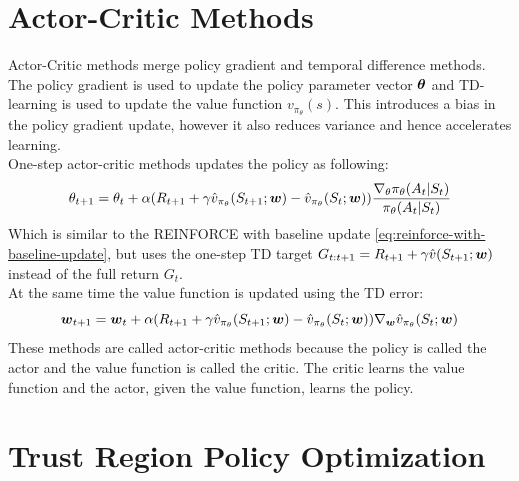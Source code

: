 \section{Actor-Critic Methods}
Actor-Critic methods merge policy gradient and temporal difference methods. The policy gradient is used to update the policy parameter vector $\boldsymbol{\theta}$ and TD-learning is used to update the value function $v_{\pi_{\theta}}(s)$. This introduces a bias in the policy gradient update, however it also reduces variance and hence accelerates learning.\\
One-step actor-critic methods updates the policy as following:
\begin{equation}
    \theta_{t+1} = \theta_t + \alpha (R_{t+1} + \gamma \hat{v}_{\pi_{\theta}}(S_{t+1}; \boldsymbol{w}) - \hat{v}_{\pi_{\theta}}(S_t; \boldsymbol{w})) \frac{\nabla_{\theta} \pi_{\theta}(A_t|S_t)}{\pi_{\theta}(A_t|S_t)}
    \label{eq:one-step-actor-critic-update}
\end{equation}
Which is similar to the REINFORCE with baseline update \eqref{eq:reinforce-with-baseline-update}, but uses the one-step TD target $G_{t:t+1} = R_{t+1} + \gamma \hat{v}(S_{t+1}; \boldsymbol{w})$ instead of the full return $G_t$.\\
At the same time the value function is updated using the TD error:
\begin{equation}
    \boldsymbol{w}_{t+1} = \boldsymbol{w}_t + \alpha (R_{t+1} + \gamma \hat{v}_{\pi_{\theta}}(S_{t+1}; \boldsymbol{w}) - \hat{v}_{\pi_{\theta}}(S_t; \boldsymbol{w})) \nabla_{\boldsymbol{w}} \hat{v}_{\pi_{\theta}}(S_t; \boldsymbol{w})
    \label{eq:one-step-actor-critic-value-function-update}
\end{equation}
These methods are called actor-critic methods because the policy is called the actor and the value function is called the critic. The critic learns the value function and the actor, given the value function, learns the policy.

\section{Trust Region Policy Optimization}